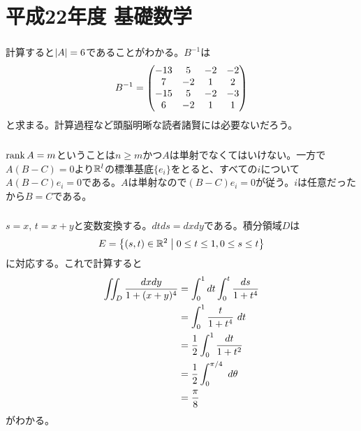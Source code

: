 \section{平成22年度 基礎数学}

\subsubsection{}%
\begin{sol}
  計算すると$\left \lvert A \right \rvert=6$であることがわかる。$B^{-1}$は
  \[
  B^{-1}= \begin{pmatrix}  -13 &5& -2& -2 \\ 7& -2& 1& 2 \\ -15& 5& -2& -3 \\ 6& -2& 1& 1 \end{pmatrix}
  \]
  と求まる。計算過程など頭脳明晰な読者諸賢には必要ないだろう。
\end{sol}

\newpage

\subsubsection{}%
\begin{sol}
  $\operatorname{rank} A = m$ということは$n \geq m$かつ$A$は単射でなくてはいけない。一方で$A(B-C)=0$より${\mathbb R}^l$の標準基底$\{ e_i \}$をとると、すべての$i$について$A(B-C)e_i = 0$である。$A$は単射なので$(B-C)e_i =0$が従う。$i$は任意だったから$B=C$である。
\end{sol}

\newpage

\subsubsection{}%
\begin{sol}
  $s=x$, $t=x+y$と変数変換する。$dt ds = dx dy$である。積分領域$D$は
  \[
  E = \left\{  (s,t ) \in {\mathbb R}^2  \mathrel{} \middle| \mathrel{} 0 \leq t \leq 1, 0 \leq s \leq t \right\}
  \]
  に対応する。これで計算すると
  \begin{align*}
    \iint_D \frac{ dx dy}{ 1 + (x+y)^4 } &= \int_0^1 dt \int_0^t \frac{ds}{1+t^4} \\
    &= \int_0^1 \frac{t }{1+t^4} \ dt \\
    &= \frac{1}{2 } \int_0^1 \frac{dt }{1+t^2}  \\
    &= \frac{1}{2} \int_0^{\pi/4} \ d{\theta}  \\
    &= \frac{ \pi }{8}
  \end{align*}
がわかる。
\end{sol}


